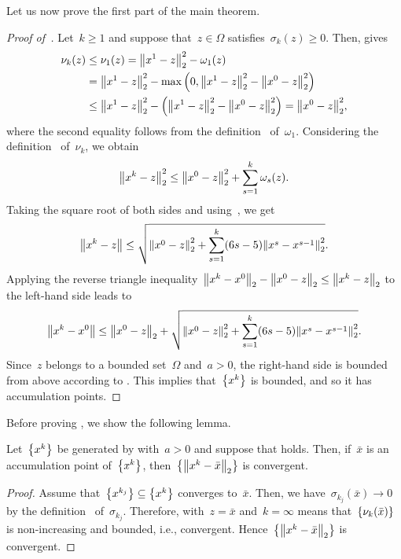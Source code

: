 \documentclass[../main]{subfiles}
\begin{document}
Let us now prove the first part of the main theorem.
\begin{proof}[Proof of~]
    Let~$k \ge 1$ and suppose that~$z \in \Omega$ satisfies~$\sigma_k(z) \ge 0$.
    Then,  gives
    \begin{align}
        \nu_k(z) & \le \nu_1(z) = \norm*{x^1 - z}_2^2 - \omega_1(z)                                                         \\
                 & = \norm*{x^1 - z}_2^2 - \max \left( 0, \norm*{x^1 - z}_2^2 - \norm*{x^0 - z}_2^2 \right)                 \\
                 & \le \norm*{x^1 - z}_2^2 - \left( \norm*{x^1 - z}_2^2 - \norm*{x^0 - z}_2^2 \right) = \norm*{x^0 - z}_2^2
        ,\end{align}
    where the second equality follows from the definition~ of~$\omega_1$.
    Considering the definition~ of~$\nu_k$, we obtain
    \begin{equation}
        \norm*{x^k - z}_2^2 \le \norm*{x^0 - z}_2^2 + \sum_{s = 1}^{k} \omega_s(z)
        .\end{equation}
    Taking the square root of both sides and using~, we get
    \begin{equation}
        \norm*{x^k - z} \le \sqrt{ \norm*{x^0 - z}_2^2 + \sum_{s = 1}^{k} (6s - 5) \norm*{x^s - x^{s - 1}}_2^2 }
        .\end{equation}
    Applying the reverse triangle inequality~$\norm*{x^k - x^0}_2 - \norm*{x^0 - z}_2 \le \norm*{x^k - z}_2$ to the left-hand side leads to
    \begin{equation}
        \norm*{x^k - x^0} \le \norm*{x^0 - z}_2 + \sqrt{ \norm*{x^0 - z}_2^2 + \sum_{s = 1}^{k} (6s - 5) \norm*{x^s - x^{s - 1}}_2^2 }
        .\end{equation}
    Since~$z$ belongs to a bounded set~$\Omega$ and~$a > 0$, the right-hand side is bounded from above according to .
    This implies that~$\set*{x^k}$ is bounded, and so it has accumulation points.
\end{proof}

Before proving , we show the following lemma.
\begin{lemma} 
    Let~$\set*{x^k}$ be generated by  with~$a > 0$ and suppose that  holds.
    Then, if~$\bar{x}$ is an accumulation point of~$\set*{x^k}$, then~$\set*{\norm*{x^k - \bar{x}}_2}$ is convergent.
\end{lemma}
\begin{proof}
    Assume that~$\set*{x^{k_j}} \subseteq \set*{x^k}$ converges to~$\bar{x}$.
    Then, we have~$\sigma_{k_j}(\bar{x}) \to 0$ by the definition~ of~$\sigma_{k_j}$.
    Therefore,  with~$z = \bar{x}$ and~$k = \infty$ means that~$\set*{\nu_k(\bar{x})}$ is non-increasing and bounded, i.e., convergent.
    Hence~$\set*{\norm*{x^k - \bar{x}}_2}$ is convergent.
\end{proof}
\end{document}
